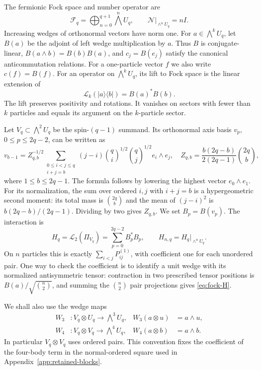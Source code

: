 The fermionic Fock space and number operator are
\[
 \mathcal F_q=\bigoplus_{n=0}^{q+1}\bigwedge^n U_q,
 \qquad \mathcal N\big|_{\wedge^n U_q}=nI.
\]
Increasing wedges of orthonormal vectors have norm one. For
$a\in\bigwedge^k U_q$, let $B(a)$ be the adjoint of left wedge
multiplication by $a$. Thus $B$ is conjugate-linear,
$B(a\wedge b)=B(b)B(a)$, and $c_j=B(e_j)$ satisfy the canonical
anticommutation relations. For a one-particle vector $f$ we also write
$c(f)=B(f)$. For an operator on $\bigwedge^k U_q$, its
lift to Fock space is the linear extension of
\begin{equation}\label{eq:lift}
 \mathcal L_k(|a\rangle\langle b|)=B(a)^*B(b).
\end{equation}
The lift preserves positivity and rotations. It vanishes on sectors
with fewer than $k$ particles and equals its argument on the $k$-particle
sector.

Let $V_q\subset\bigwedge^2 U_q$ be the spin-$(q-1)$ summand. Its
orthonormal axis basis $v_p$, $0\le p\le2q-2$, can be written as
\begin{equation}\label{eq:pair-rows}
 v_{b-1}=Z_{q,b}^{-1/2}
 \sum_{\substack{0\le i<j\le q\\i+j=b}}
 (j-i)\binom qi^{1/2}\binom qj^{1/2}e_i\wedge e_j,
 \quad
 Z_{q,b}=\frac{b(2q-b)}{2(2q-1)}\binom{2q}{b},
\end{equation}
where $1\le b\le2q-1$. The formula follows by lowering the highest
vector $e_0\wedge e_1$. For its normalization, the sum over ordered
$i,j$ with $i+j=b$ is a hypergeometric second moment: its total mass
is $\binom{2q}{b}$ and the mean of $(j-i)^2$ is
$b(2q-b)/(2q-1)$. Dividing by two gives $Z_{q,b}$.
We set $B_p=B(v_p)$. The interaction is
\begin{equation}\label{eq:fock-H}
 H_q=\mathcal L_2(\Pi_{V_q})=
 \sum_{p=0}^{2q-2}B_p^*B_p,
 \qquad H_{n,q}=H_q\big|_{\wedge^n U_q}.
\end{equation}
On $n$ particles this is exactly $\sum_{i<j}P_{ij}^{(1)}$, with
coefficient one for each unordered pair. One way to check the coefficient
is to identify a unit wedge with its normalized antisymmetric tensor:
contraction in two prescribed tensor positions is $B(a)/\sqrt{\binom n2}$,
and summing the $\binom n2$ pair projections gives
\eqref{eq:fock-H}.

We shall also use the wedge maps
\begin{equation}\label{eq:wedge-maps}
 \begin{aligned}
 W_3 &: V_q\otimes U_q\longrightarrow\bigwedge^3 U_q,
       &W_3(a\otimes u)&=a\wedge u,\\
 W_4 &: V_q\otimes V_q\longrightarrow\bigwedge^4 U_q,
       &W_4(a\otimes b)&=a\wedge b.
 \end{aligned}
\end{equation}
In particular $V_q\otimes V_q$ uses ordered pairs. This convention
fixes the coefficient of the four-body term in the normal-ordered square
used in Appendix~\ref{app:retained-blocks}.

